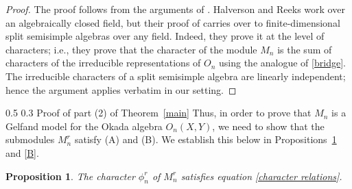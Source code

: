 \documentclass[12pt,reqno]{amsart}
\makeatletter
\renewcommand{\subsection}{\@startsection{subsection}{2}{0pt}%
  {0.5\baselineskip}%
  {0.3\baselineskip}%
  {\normalfont\bfseries}}
\numberwithin{equation}{section}
\newtheorem{proposition}[theorem]{Proposition}
\theoremstyle{definition}
\theoremstyle{definition}
\makeatother
\begin{document}
\begin{proof}
    The proof follows from the arguments of \cite[Theorem 4.1]{HalversonReeks}. 
     Halverson and Reeks work over an algebraically closed field, but their proof of \cite[Theorem 4.1]{HalversonReeks} carries over to finite-dimensional split semisimple algebras over any field. Indeed, they prove it at the level of characters; i.e., they prove that the character of the module $M_n$ is the sum of characters of the irreducible representations of $O_n$ using the analogue of \eqref{bridge}. The irreducible characters of a split semisimple algebra are linearly independent; hence the argument applies verbatim in our setting. 
\end{proof}
\subsection{Proof of part (2) of Theorem~\ref{main}}
Thus, in order to prove that $M_n$ is a Gelfand model for the Okada algebra $O_n(X,Y)$, we need to show that the submodules $M_n^r$ satisfy (A) and (B). We establish this below in Propositions~\ref{A} and \ref{B}. 

\begin{proposition}\label{A}
The character $\phi_n^r$ of $M_n^r$ satisfies equation \eqref{character relations}.
\end{proposition}
\end{document}
